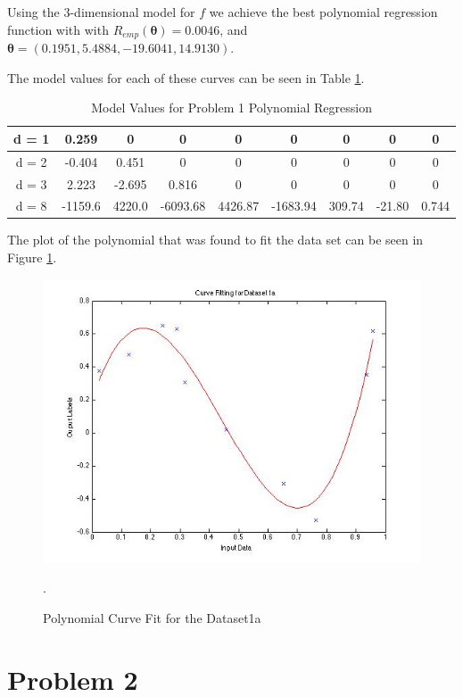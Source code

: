\documentclass[paper=a4, fontsize=11pt]{scrartcl} %
\begin{document}
Using the 3-dimensional model for $f$ we achieve the best polynomial regression function with  with $R_{emp}(\bm{\theta}) = 0.0046$, and $\bm{\theta} = (0.1951, 5.4884, -19.6041, 14.9130)$.

The model values for each of these curves can be seen in Table \ref{tab:prob1_models}.

\begin{table}
\label{tab:prob1_models}
\caption{Model Values for Problem 1 Polynomial Regression}
\begin{tabular}{|c|c|c|c|c|c|c|c|c|}
\hline
d = 1 & 0.259&0 &0 &0 &0 &0 &0 & 0\\ \hline
d = 2 & -0.404 &0.451 &0 &0 &0 &0 &0 & 0\\ \hline
d = 3 & 2.223 &-2.695&0.816 &0 &0 &0 &0 & 0\\ \hline
d = 8 & -1159.6&4220.0 &-6093.68&4426.87&-1683.94 &309.74&-21.80 & 0.744\\
\hline
\end{tabular}
\end{table}


The plot of the polynomial that was found to fit the data set can be seen in Figure \ref{fig:prob1_curve1}.

\begin{figure}
\centering
\includegraphics[scale=0.4]{Curve.jpg}
\caption{Polynomial Curve Fit for the Dataset1a}
\label{fig:prob1_curve1}.
\end{figure}

\section{Problem 2}
\end{document}
